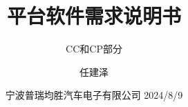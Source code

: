 
\title{平台软件需求说明书\XeLaTeX}
\subtitle{CC和CP部分 }
\author{任建泽}
\date{宁波普瑞均胜汽车电子有限公司 2024/8/9}









\frontmatter
\tableofcontents
 \mainmatter

\clearpage
{} %
\setcounter{page}{1} %

